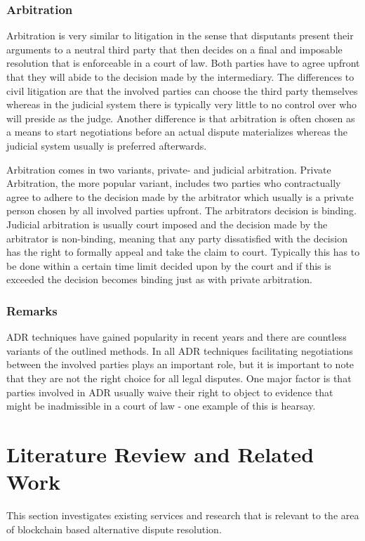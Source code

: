 \documentclass[12pt,msc,a4paper,oneside]{ucl_thesis}
\begin{document}
\subsubsection{Arbitration}
Arbitration is very similar to litigation in the sense that disputants present their arguments to a neutral third party that then decides on a final and imposable resolution that is enforceable in a court of law. Both parties have to agree upfront that they will abide to the decision made by the intermediary.
The differences to civil litigation are that the involved parties can choose the third party themselves whereas in the judicial system there is typically very little to no control over who will preside as the judge. Another difference is that arbitration is often chosen as a means to start negotiations before an actual dispute materializes whereas the judicial system usually is preferred afterwards. \cite{adr_overview:findlaw}

Arbitration comes in two variants, private- and judicial arbitration. Private Arbitration, the more popular variant, includes two parties who contractually agree to adhere to the decision made by the arbitrator which usually is a private person chosen by all involved parties upfront. The arbitrators decision is binding. Judicial arbitration is usually court imposed and the decision made by the arbitrator is non-binding, meaning that any party dissatisfied with the decision has the right to formally appeal and take the claim to court. Typically this has to be done within a certain time limit decided upon by the court and if this is exceeded the decision becomes binding just as with private arbitration.

\subsubsection{Remarks}
ADR techniques have gained popularity in recent years and there are countless variants of the outlined methods. In all ADR techniques facilitating negotiations between the involved parties plays an important role, but it is important to note that they are not the right choice for all legal disputes. One major factor is that parties involved in ADR usually waive their right to object to evidence that might be inadmissible in a court of law - one example of this is hearsay.

\section{Literature Review and Related Work} \label{sec:literature_review}
This section investigates existing services and research that is relevant to the area of blockchain based alternative dispute resolution.
\end{document}
